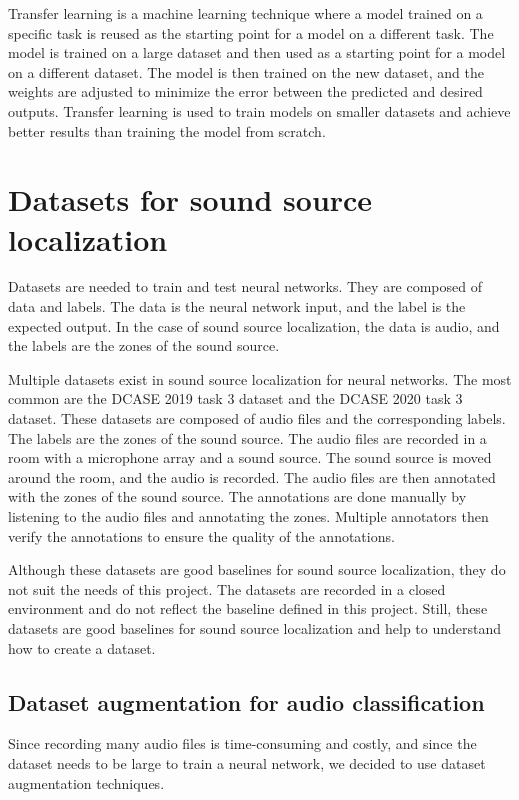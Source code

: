Transfer learning is a machine learning technique where a model trained on a specific task is reused as the starting point for a model on a different task. The model is trained on a large dataset and then used as a starting point for a model on a different dataset. The model is then trained on the new dataset, and the weights are adjusted to minimize the error between the predicted and desired outputs. Transfer learning is used to train models on smaller datasets and achieve better results than training the model from scratch.

\section{Datasets for sound source localization}
\label{sec:datasetsSSL}

Datasets are needed to train and test neural networks. They are composed of data and labels. The data is the neural network input, and the label is the expected output. In the case of sound source localization, the data is audio, and the labels are the zones of the sound source. 

Multiple datasets exist in sound source localization for neural networks. The most common are the DCASE 2019 task 3 dataset\cite{Adavanne2019_DCASE} and the DCASE 2020 task 3 dataset\cite{politis2020dataset}. These datasets are composed of audio files and the corresponding labels. The labels are the zones of the sound source. The audio files are recorded in a room with a microphone array and a sound source. The sound source is moved around the room, and the audio is recorded. The audio files are then annotated with the zones of the sound source. The annotations are done manually by listening to the audio files and annotating the zones. Multiple annotators then verify the annotations to ensure the quality of the annotations. 

Although these datasets are good baselines for sound source localization, they do not suit the needs of this project. The datasets are recorded in a closed environment and do not reflect the baseline defined in this project. Still, these datasets are good baselines for sound source localization and help to understand how to create a dataset.




\subsection{Dataset augmentation for audio classification}
Since recording many audio files is time-consuming and costly, and since the dataset needs to be large to train a neural network, we decided to use dataset augmentation techniques.

